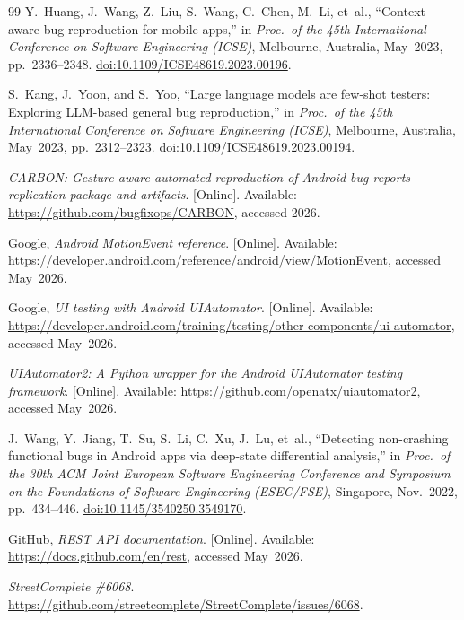 \documentclass[10pt,conference,a4paper]{IEEEtran}
\begin{document}
\begin{thebibliography}{99}
  Y.~Huang, J.~Wang, Z.~Liu, S.~Wang, C.~Chen, M.~Li, et~al.,
  ``Context-aware bug reproduction for mobile apps,''
  in \emph{Proc.\ of the 45th International Conference on Software
  Engineering (ICSE)}, Melbourne, Australia, May~2023, pp.~2336--2348.
  \href{https://doi.org/10.1109/ICSE48619.2023.00196}{doi:10.1109/ICSE48619.2023.00196}.

  S.~Kang, J.~Yoon, and S.~Yoo,
  ``Large language models are few-shot testers: Exploring LLM-based
  general bug reproduction,''
  in \emph{Proc.\ of the 45th International Conference on Software
  Engineering (ICSE)}, Melbourne, Australia, May~2023, pp.~2312--2323.
  \href{https://doi.org/10.1109/ICSE48619.2023.00194}{doi:10.1109/ICSE48619.2023.00194}.

  \emph{CARBON: Gesture-aware automated reproduction of Android bug
  reports---replication package and artifacts}.
  [Online]. Available:
  \url{https://github.com/bugfixops/CARBON}, accessed 2026.


  Google, \emph{Android MotionEvent reference}.
  [Online]. Available:
  \url{https://developer.android.com/reference/android/view/MotionEvent},
  accessed May~2026.

  Google, \emph{UI testing with Android UIAutomator}.
  [Online]. Available:
  \url{https://developer.android.com/training/testing/other-components/ui-automator},
  accessed May~2026.

  \emph{UIAutomator2: A Python wrapper for the Android UIAutomator
  testing framework}.
  [Online]. Available:
  \url{https://github.com/openatx/uiautomator2}, accessed May~2026.

  J.~Wang, Y.~Jiang, T.~Su, S.~Li, C.~Xu, J.~Lu, et~al.,
  ``Detecting non-crashing functional bugs in Android apps via deep-state
  differential analysis,''
  in \emph{Proc.\ of the 30th ACM Joint European Software Engineering
  Conference and Symposium on the Foundations of Software Engineering
  (ESEC/FSE)}, Singapore, Nov.~2022, pp.~434--446.
  \href{https://doi.org/10.1145/3540250.3549170}{doi:10.1145/3540250.3549170}.

  GitHub, \emph{REST API documentation}.
  [Online]. Available:
  \url{https://docs.github.com/en/rest}, accessed May~2026.

  \emph{StreetComplete \#6068}.
  \url{https://github.com/streetcomplete/StreetComplete/issues/6068}.


\end{thebibliography}
\end{document}
